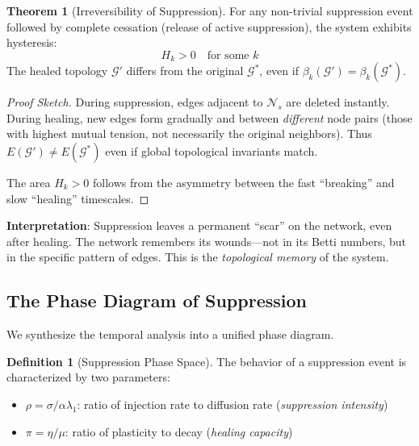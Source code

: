 \documentclass[12pt,a4paper]{article}
\theoremstyle{definition}
\newtheorem{definition}{Definition}[section]
\newtheorem{theorem}{Theorem}[section]
\theoremstyle{remark}
\newcommand{\NS}{\mathcal{N}_s}          %
\newcommand{\Graph}{\mathcal{G}}         %
\begin{document}
\begin{theorem}[Irreversibility of Suppression]
\label{thm:hysteresis}
For any non-trivial suppression event followed by complete cessation (release of active suppression), the system exhibits hysteresis:
\begin{equation}
    \boxed{
    H_k > 0 \quad \text{for some } k
    }
\end{equation}
The healed topology $\Graph'$ differs from the original $\Graph^*$, even if $\beta_k(\Graph') = \beta_k(\Graph^*)$.
\end{theorem}

\begin{proof}[Proof Sketch]
During suppression, edges adjacent to $\NS$ are deleted instantly. During healing, new edges form gradually and between \emph{different} node pairs (those with highest mutual tension, not necessarily the original neighbors). Thus $E(\Graph') \neq E(\Graph^*)$ even if global topological invariants match.

The area $H_k > 0$ follows from the asymmetry between the fast ``breaking'' and slow ``healing'' timescales.
\end{proof}

\textbf{Interpretation}: Suppression leaves a permanent ``scar'' on the network, even after healing. The network remembers its wounds—not in its Betti numbers, but in the specific pattern of edges. This is the \emph{topological memory} of the system.

\subsection{The Phase Diagram of Suppression}

We synthesize the temporal analysis into a unified phase diagram.

\begin{definition}[Suppression Phase Space]
The behavior of a suppression event is characterized by two parameters:
\begin{itemize}
    \item $\rho = \sigma / \alpha\lambda_1$: ratio of injection rate to diffusion rate (\emph{suppression intensity})
    \item $\pi = \eta / \mu$: ratio of plasticity to decay (\emph{healing capacity})
\end{itemize}
\end{definition}
\end{document}
